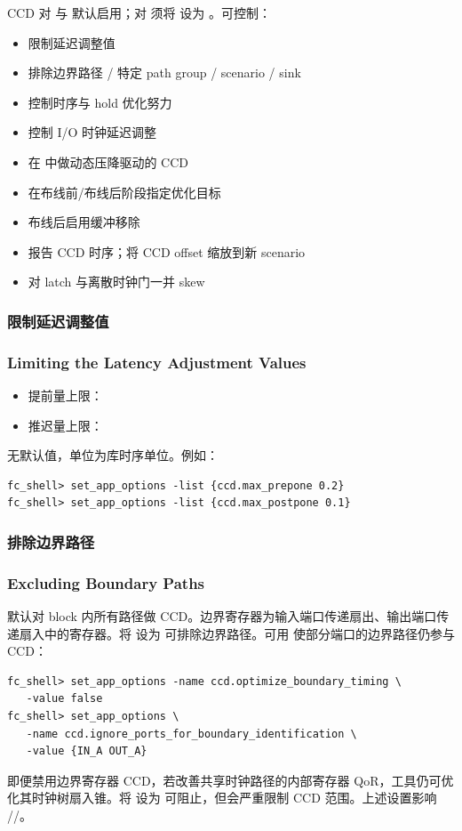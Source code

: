 CCD 对  与  默认启用；对  须将  设为 。可控制：
\begin{itemize}
  \item 限制延迟调整值
  \item 排除边界路径 / 特定 path group / scenario / sink
  \item 控制时序与 hold 优化努力
  \item 控制 I/O 时钟延迟调整
  \item 在  中做动态压降驱动的 CCD
  \item 在布线前/布线后阶段指定优化目标
  \item 布线后启用缓冲移除
  \item 报告 CCD 时序；将 CCD offset 缩放到新 scenario
  \item 对 latch 与离散时钟门一并 skew
\end{itemize}

\subsubsection{限制延迟调整值}
\subsubsection*{Limiting the Latency Adjustment Values}

\begin{itemize}
  \item 提前量上限：
  \item 推迟量上限：
\end{itemize}
无默认值，单位为库时序单位。例如：
\begin{lstlisting}
fc_shell> set_app_options -list {ccd.max_prepone 0.2}
fc_shell> set_app_options -list {ccd.max_postpone 0.1}
\end{lstlisting}

\subsubsection{排除边界路径}
\subsubsection*{Excluding Boundary Paths}

默认对 block 内所有路径做 CCD。边界寄存器为输入端口传递扇出、输出端口传递扇入中的寄存器。将  设为  可排除边界路径。可用  使部分端口的边界路径仍参与 CCD：
\begin{lstlisting}
fc_shell> set_app_options -name ccd.optimize_boundary_timing \
   -value false
fc_shell> set_app_options \
   -name ccd.ignore_ports_for_boundary_identification \
   -value {IN_A OUT_A}
\end{lstlisting}
即便禁用边界寄存器 CCD，若改善共享时钟路径的内部寄存器 QoR，工具仍可优化其时钟树扇入锥。将  设为  可阻止，但会严重限制 CCD 范围。上述设置影响 //。

